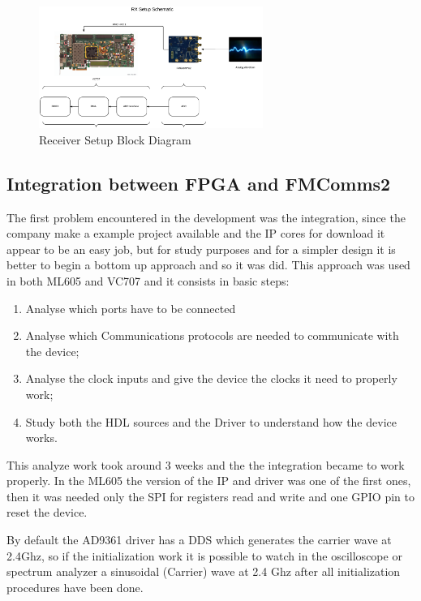 \begin{figure}[htbp]
    \centering
    \includegraphics[width=0.65\textwidth]{./figures/rx_setup}
    \caption{ Receiver Setup Block Diagram
    \label{fig:rxsetup}}
\end{figure}



\subsection{Integration between FPGA and FMComms2}

The first problem encountered in the development was the integration, since the
company make a example project available and the IP cores for download it appear
to be an easy job, but for study purposes and for a simpler design it is better
to begin a bottom up approach and so it was did. This approach was used in both
ML605 and VC707 and it consists in basic steps:

\begin{enumerate}
    \item Analyse which ports have to be connected
    \item Analyse which Communications protocols are needed to communicate with the device;
    \item Analyse the clock inputs and give the device the clocks it need to properly work;
    \item Study both the HDL sources and the Driver to understand how the device works.
\end{enumerate}

This analyze work took around 3 weeks and the the integration became to work
properly. In the ML605 the version of the IP and driver was one of the first
ones, then it was needed only the SPI for registers read and write and one
GPIO pin to reset the device.

By default the AD9361 driver has a DDS which generates the carrier wave at 2.4Ghz,
so if the initialization work it is possible to watch in the oscilloscope or
spectrum analyzer a sinusoidal (Carrier) wave at 2.4 Ghz after all initialization
procedures have been done.

